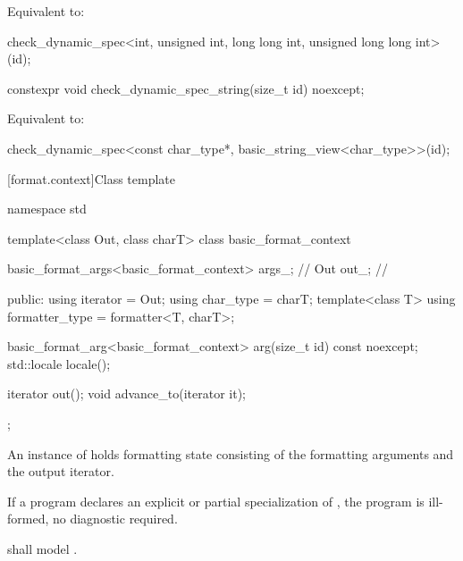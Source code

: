 \begin{itemdescr}
\pnum
\effects
Equivalent to:
\begin{codeblock}
check_dynamic_spec<int, unsigned int, long long int, unsigned long long int>(id);
\end{codeblock}
\end{itemdescr}

%
\begin{itemdecl}
constexpr void check_dynamic_spec_string(size_t id) noexcept;
\end{itemdecl}

\begin{itemdescr}
\pnum
\effects
Equivalent to:
\begin{codeblock}
check_dynamic_spec<const char_type*, basic_string_view<char_type>>(id);
\end{codeblock}
\end{itemdescr}

[format.context]{Class template }

%
%
%
%
\begin{codeblock}
namespace std {
  template<class Out, class charT>
  class basic_format_context {
    basic_format_args<basic_format_context> args_;      // \expos
    Out out_;                                           // \expos

  public:
    using iterator = Out;
    using char_type = charT;
    template<class T> using formatter_type = formatter<T, charT>;

    basic_format_arg<basic_format_context> arg(size_t id) const noexcept;
    std::locale locale();

    iterator out();
    void advance_to(iterator it);
  };
}
\end{codeblock}

\pnum
An instance of  holds formatting state
consisting of the formatting arguments and the output iterator.

\pnum
If a program declares an explicit or partial specialization of
,
the program is ill-formed, no diagnostic required.

\pnum
{} shall model .

